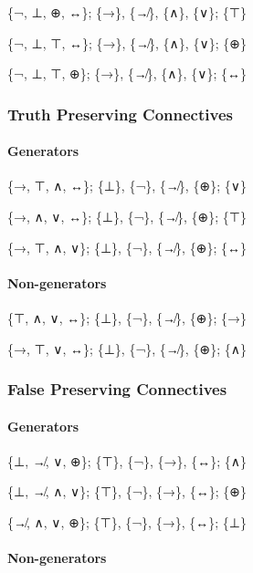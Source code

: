 \{¬, ⊥, ⊕, ↔\}; \{→\}, \{↛\}, \{∧\}, \{∨\}; \{⊤\}

\{¬, ⊥, ⊤, ↔\}; \{→\}, \{↛\}, \{∧\}, \{∨\}; \{⊕\}

\{¬, ⊥, ⊤, ⊕\}; \{→\}, \{↛\}, \{∧\}, \{∨\}; \{↔\}

\hypertarget{truth-preserving-connectives-1}{%
\subsubsection{Truth Preserving
Connectives}\label{truth-preserving-connectives-1}}

\hypertarget{generators-3}{%
\paragraph{Generators}\label{generators-3}}

\{→, ⊤, ∧, ↔\}; \{⊥\}, \{¬\}, \{↛\}, \{⊕\}; \{∨\}

\{→, ∧, ∨, ↔\}; \{⊥\}, \{¬\}, \{↛\}, \{⊕\}; \{⊤\}

\{→, ⊤, ∧, ∨\}; \{⊥\}, \{¬\}, \{↛\}, \{⊕\}; \{↔\}

\hypertarget{non-generators-3}{%
\paragraph{Non-generators}\label{non-generators-3}}

\{⊤, ∧, ∨, ↔\}; \{⊥\}, \{¬\}, \{↛\}, \{⊕\}; \{→\}

\{→, ⊤, ∨, ↔\}; \{⊥\}, \{¬\}, \{↛\}, \{⊕\}; \{∧\}

\hypertarget{false-preserving-connectives-1}{%
\subsubsection{False Preserving
Connectives}\label{false-preserving-connectives-1}}

\hypertarget{generators-4}{%
\paragraph{Generators}\label{generators-4}}

\{⊥, ↛, ∨, ⊕\}; \{⊤\}, \{¬\}, \{→\}, \{↔\}; \{∧\}

\{⊥, ↛, ∧, ∨\}; \{⊤\}, \{¬\}, \{→\}, \{↔\}; \{⊕\}

\{↛, ∧, ∨, ⊕\}; \{⊤\}, \{¬\}, \{→\}, \{↔\}; \{⊥\}

\hypertarget{non-generators-4}{%
\paragraph{Non-generators}\label{non-generators-4}}

